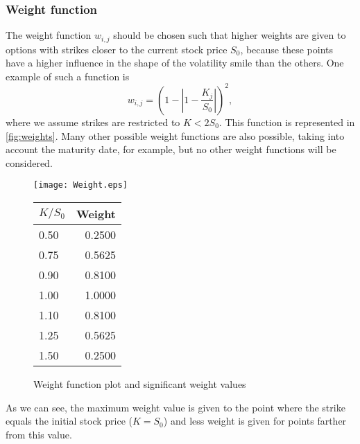 \subsubsection{Weight function}
The weight function $w_{i,j}$ should be chosen such that higher weights are given to options with strikes closer to the current stock price $S_0$, because these points have a higher influence in the shape of the volatility smile than the others.
One example of such a function is
\begin{equation}\label{weight}
w_{i,j}=\left(1-\left|1-\frac{K_j}{S_0}\right|\right)^2,
\end{equation}
\noindent where we assume strikes are restricted to $K<2S_0$.
This function is represented in \autoref{fig:weights}. Many other possible weight functions are also possible, taking into account the maturity date, for example, but no other weight functions will be considered.

\begin{figure}[!htb]
  \begin{minipage}[b]{0.65\linewidth}
    \centering
    \texttt{[image: Weight.eps]}
  \end{minipage}%
  \begin{minipage}[b]{0.30\linewidth}
    \centering
    \renewcommand{\arraystretch}{1.1}
\begin{tabular}{@{}lr@{}}
\toprule
$K/S_0$ & Weight \\ \midrule
0.50  & 0.2500 \\
0.75  & 0.5625 \\
0.90  & 0.8100 \\
1.00  & 1.0000 \\
1.10  & 0.8100 \\
1.25  & 0.5625 \\ 
1.50  & 0.2500 \\\bottomrule
\end{tabular}
    \vspace{5em}
  \end{minipage}
\caption[Weight function plot and significant weight values]{Weight function plot and significant weight values}\label{fig:weights}
\end{figure}    
    
\noindent As we can see, the maximum weight value is given to the point where the strike equals the initial stock price ($K=S_0$) and less weight is given for points farther from this value.

